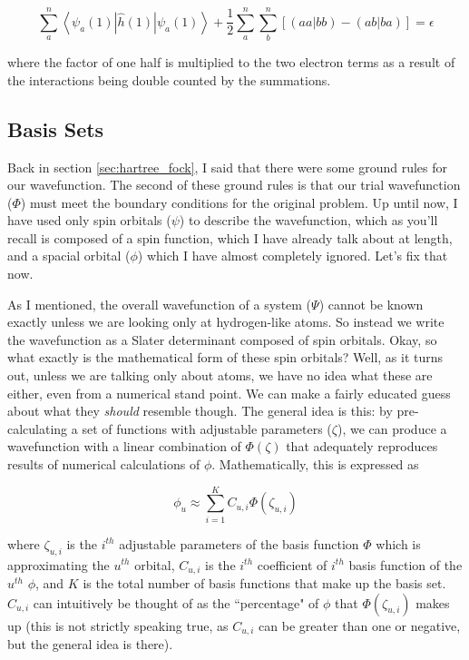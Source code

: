 \documentclass[12pt]{report}
\begin{document}
 \begin{equation}
\label{eq:hartree-fock_eq}
\sum_{a}^{n}\left<\psi_{a}(1)|\hat{h}(1)|\psi_{a}(1)\right> + \frac{1}{2}\sum^{n}_{a}\sum^{n}_{b}\left[\left(aa|bb\right) - \left(ab|ba\right)\right] = \epsilon
\end{equation}

where the factor of one half is multiplied to the two electron terms as a result of the interactions being double counted by the summations.

\subsection{Basis Sets}
\label{subsec:basis_sets}
Back in section \ref{sec:hartree_fock}, I said that there were some ground rules for our wavefunction. The second of these ground rules is that our trial wavefunction ($\Phi$) must meet the boundary conditions for the original problem. Up until now, I have used only spin orbitals ($\psi$) to describe the wavefunction, which as you'll recall is composed of a spin function, which I have already talk about at length, and a spacial orbital ($\phi$) which I have almost completely ignored. Let's fix that now. 

As I mentioned, the overall wavefunction of a system ($\Psi$) cannot be known exactly unless we are looking only at hydrogen-like atoms. So instead we write the wavefunction as a Slater determinant composed of spin orbitals. Okay, so what exactly is the mathematical form of these spin orbitals? Well, as it turns out, unless we are talking only about atoms, we have no idea what these are either, even from a numerical stand point. We can make a fairly educated guess about what they \textit{should} resemble though. The general idea is this: by pre-calculating a set of functions with adjustable parameters ($\zeta$), we can produce a wavefunction with a linear combination of $\Phi(\zeta)$ that adequately reproduces results of numerical calculations of $\phi$. Mathematically, this is expressed as\cite{Ostlund}

\begin{equation}
\label{eq:linear_comb_bs}
\phi_{u} \approx \sum^{K}_{i=1}C_{u,i}\Phi(\zeta_{u,i})
\end{equation}

where $\zeta_{u,i}$ is the $i^{th}$ adjustable parameters of the basis function $\Phi$ which is approximating the $u^{th}$ orbital, $C_{u,i}$ is the $i^{th}$ coefficient of $i^{th}$ basis function of the $u^{th}$ $\phi$, and $K$ is the total number of basis functions that make up the basis set. $C_{u,i}$ can intuitively be thought of as the ``percentage" of $\phi$ that $\Phi(\zeta_{u,i})$ makes up (this is not strictly speaking true, as $C_{u,i}$ can be greater than one or negative, but the general idea is there).
\end{document}

